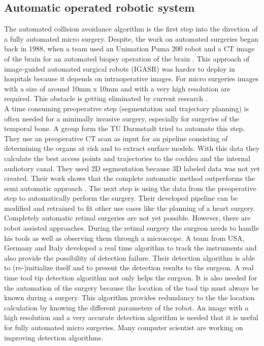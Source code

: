 \newpage
\subsection{Automatic operated robotic system}
\label{sec:automaticoperation}
The automated collision avoidance algorithm is the first step into the direction of a fully automated micro surgery. Despite, the work on automated surgeries began back in 1988, when a team used an Unimation Puma 200 robot and a CT image of the brain for an automated biopsy operation of the brain \cite{automatedBrainSurgery1988}. This approach of image-guided automated surgical robots (IGASR) was harder to deploy in hospitals because it depends on intraoperative images. For micro surgeries images with a size of around 10mm x 10mm and with a very high resolution are required. This obstacle is getting eliminated by current research \cite{ImagingTechniques}.  \\
A time consuming preoperative step (segmentation and trajectory planning) is often needed for a minimally invasive surgery, especially for surgeries of the temporal bone. A group form the TU Darmstadt tried to automate this step. They use an preoperative CT scan as input for an pipeline consisting of determining the organs at risk and to extract surface models. With this data they calculate the best access points and trajectories to the cochlea and the internal audiotory canal. They used 2D segmentation because 3D labeled data was not yet created. Their work shows that the complete automatic method outperforms the semi automatic approach \cite{PreoperativeStep}. The next step is using the data from the preoperative step to automatically perform the surgery. Their developed pipeline can be modified and retrained to fit other use cases like the planning of a heart surgery.\\
Completely automatic retinal surgeries are not yet possible. However, there are robot assisted approaches. During the retinal surgery the surgeon needs to handle his tools as well as observing them through a microscope. A team from USA, Germany and Italy developed a real time algorithm to track the instruments and also provide the possibility of detection failure. Their detection algorithm is able to (re-)initialize itself \cite{retinal_tool_detector} and to present the detection results to the surgeon. A real time tool tip detection algorithm not only helps the surgeon. It is also needed for the automation of the surgery because the location of the tool tip must always be known during a surgery. This algorithm provides redundancy to the the location calculation by knowing the different parameters of the robot. An image with a high resolution and a very accurate detection algorithm is needed that it is useful for fully automated micro surgeries. Many computer scientist are working on improving detection algorithms. \\

